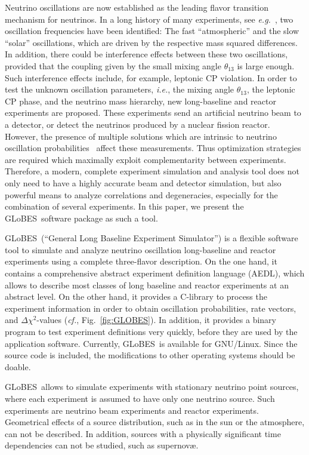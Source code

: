 \documentclass[12pt,a4paper]{article}
\newcommand{\ie}{{\it i.e.}}
\newcommand{\eg}{{\it e.g.}}
\newcommand{\cf}{{\it cf.}}
\newcommand{\fig}{Fig.}
\newcommand{\GLOBES}{{\sf GLoBES}}
\newcommand{\figu}[1]{\fig~\ref{fig:#1}}
\begin{document}
Neutrino oscillations are now established as the leading flavor
transition mechanism for neutrinos. In a long history of many experiments, see
\eg~\cite{Barger:2003qi}, 
two oscillation
frequencies have been identified: The fast ``atmospheric'' and the
slow ``solar'' oscillations, which are driven by the respective
mass squared differences.  In addition, there could be interference
effects between these two oscillations, provided that the coupling given by 
the small mixing angle $\theta_{13}$ is large enough. Such interference
effects include, for example, leptonic CP violation.  In order to
test the unknown oscillation parameters, \ie, the mixing angle $\theta_{13}$,
 the leptonic CP phase, and the
neutrino mass hierarchy, new long-baseline and reactor experiments 
are proposed.
These experiments send an artificial neutrino beam to a detector, or
detect the neutrinos produced by a nuclear fission reactor. However,
the presence of multiple solutions which are intrinsic to
 neutrino oscillation probabilities~\cite{Fogli:1996pv,
Burguet-Castell:2001ez,Minakata:2001qm,Barger:2001yr} 
affect these measurements.
Thus optimization strategies are required which maximally exploit 
complementarity between experiments. Therefore, a modern, complete experiment 
simulation  and analysis tool does not only need to have 
a highly accurate beam and detector simulation, but also powerful 
means to analyze correlations and degeneracies, especially for the combination
of several experiments.
In this paper, we present the \GLOBES\ software package
as such a tool.

\GLOBES\ (``General Long Baseline Experiment Simulator'') is a flexible
software tool to simulate and analyze neutrino oscillation 
long-baseline and reactor experiments using a 
complete three-flavor description. On the
one hand, it contains a comprehensive abstract experiment definition
language (AEDL), which allows to describe 
most classes of long baseline and reactor experiments
at an abstract level. On the other hand, it provides a C-library to 
process the experiment information in order to obtain oscillation
probabilities, rate vectors, and $\Delta \chi^2$-values (\cf, \figu{GLOBES}). 
In addition, it provides a binary program to test experiment
definitions very quickly, before they are used by the application software.
Currently, \GLOBES\ is available for GNU/Linux. Since the source code is 
included, the modifications to other operating systems should be doable.

\GLOBES\ allows to simulate experiments with stationary neutrino point 
sources, where each experiment is assumed to have only one neutrino source.
Such experiments are neutrino beam experiments and reactor experiments. 
Geometrical effects of a source distribution, such as in the sun or the 
atmosphere, can not be described. In addition, sources with a physically 
significant time dependencies  can not be studied, such as  supernov\ae. 
\end{document}
